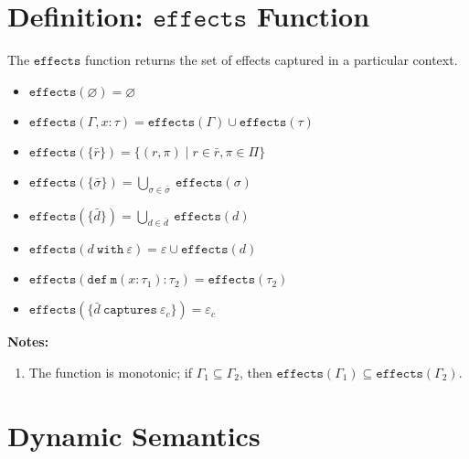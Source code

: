 \documentclass{llncs}
\newcommand{\keywadj}[1]{\mathtt{#1}}
\newcommand{\keyw}[1]{\keywadj{#1}~}
\newcommand{\kwa}[1]{\keywadj{ #1 }}
\begin{document}
\section{Definition: $\keywadj{effects}$ Function}

\noindent
The $\keywadj{effects}$ function returns the set of effects captured in a particular context.

\begin{itemize}
	\item $\keywadj{effects}(\varnothing) = \varnothing$
	\item $\keywadj{effects}(\Gamma, x : \tau) = \keywadj{effects}(\Gamma) \cup \keywadj{effects}(\tau)$
	\item $\keywadj{effects}(\{\bar r\}) = \{ (r, \pi) \mid r \in \bar r, \pi \in \Pi \}$
	\item $\keywadj{effects}(\{\bar \sigma\}) = \bigcup_{\sigma \in \bar \sigma}~\keywadj{effects}(\sigma)$
	\item $\keywadj{effects}(\{\bar d\}) = \bigcup_{d \in \bar d}~\keywadj{effects}(d)$
	\item $\keywadj{effects}(d~\keyw{with} \varepsilon) = \varepsilon \cup \keywadj{effects}(d)$
	\item $\keywadj{effects}(\keywadj{def~m}(x : \tau_1) : \tau_2) = \keywadj{effects}(\tau_2)$
	\item $\keywadj{effects}(\{\bar d ~\keyw{captures} \varepsilon_c\}) = \varepsilon_c$
\end{itemize}

\noindent \textbf{Notes:}

\begin{enumerate}
	\item The function is monotonic; if $\Gamma_1 \subseteq \Gamma_2$, then $\kwa{effects}(\Gamma_1) \subseteq \kwa{effects}(\Gamma_2)$.
\end{enumerate}


\section{Dynamic Semantics}

~\\
\noindent
{}
\end{document}
